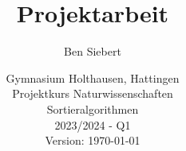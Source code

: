 \documentclass[./entry.tex]{subfiles}
\begin{document}
    \title{Projektarbeit}
    \author{Ben Siebert}
    \date{{
        Gymnasium Holthausen, Hattingen \\
        Projektkurs Naturwissenschaften \\
        Sortieralgorithmen \\
        2023/2024 - Q1 \\
        Version: \today
    }}
    \maketitle

    \thispagestyle{empty}
\end{document}
